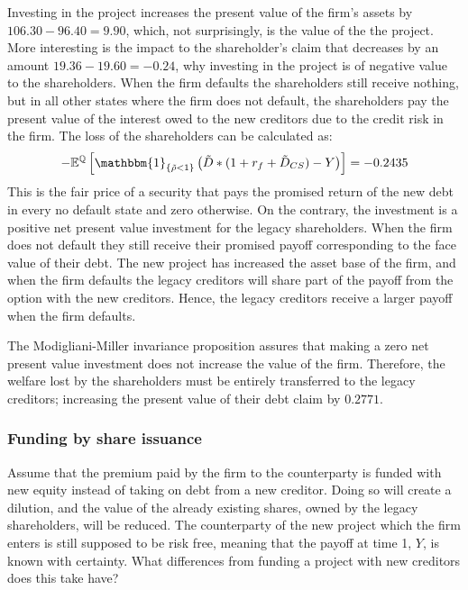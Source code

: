 \documentclass[../main.tex]{subfiles}
\begin{document}
        Investing in the project increases the present value of the firm's assets by $106.30 - 96.40 = 9.90$, which, not surprisingly, is the value of the the project.
        More interesting is the impact to the shareholder's claim that decreases by an amount $19.36 - 19.60 = -0.24$, why investing in the project is of negative value to the shareholders.
        When the firm defaults the shareholders still receive nothing, but in all other states where the firm does not default, the shareholders pay the present value of the interest owed to the new creditors due to the credit risk in the firm.
        The loss of the shareholders can be calculated as: 
            \begin{align}
                -\mathbb{E}^{\mathbb{Q}}\left[
                    \mathbbm{1}_{\{\tilde{\rho} < 1\}}
                    \left(
                        \tilde{D}*(1+r_{f} + \tilde{D}_{CS})
                        - Y
                    \right)
                \right]
                = -0.2435
            \end{align}
        This is the fair price of a security that pays the promised return of the new debt in every no default state and zero otherwise. 
        On the contrary, the investment is a positive net present value investment for the legacy shareholders.
        When the firm does not default they still receive their promised payoff corresponding to the face value of their debt.
        The new project has increased the asset base of the firm, and when the firm defaults the legacy creditors will share part of the payoff from the option with the new creditors.
        Hence, the legacy creditors receive a larger payoff when the firm defaults. 

        The Modigliani-Miller invariance proposition assures that making a zero net present value investment does not increase the value of the firm.
        Therefore, the welfare lost by the shareholders must be entirely transferred to the legacy creditors; increasing the present value of their debt claim by $0.2771$.


    \subsubsection{Funding by share issuance}
        Assume that the premium paid by the firm to the counterparty is funded with new equity instead of taking on debt from a new creditor. Doing so will create a dilution, and the value of the already existing shares, owned by the legacy shareholders, will be reduced. The counterparty of the new project which the firm enters is still supposed to be risk free, meaning that the payoff at time 1, $Y$, is known with certainty. What differences from funding a project with new creditors does this take have?
\end{document}
